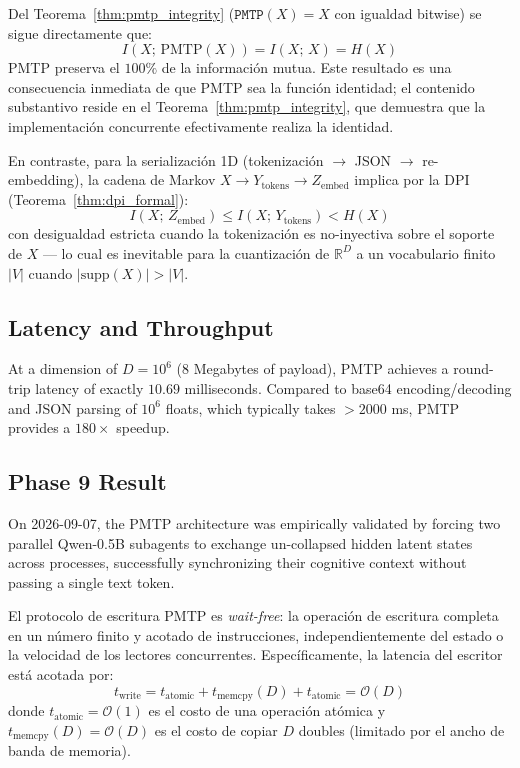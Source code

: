 \begin{corollary}
\label{cor:pmtp_info}
Del Teorema~\ref{thm:pmtp_integrity} ($\texttt{PMTP}(X) = X$ con igualdad
bitwise) se sigue directamente que:
\begin{equation}
I(X;\, \text{PMTP}(X)) = I(X;\, X) = H(X)
\end{equation}
PMTP preserva el $100\%$ de la información mutua. Este resultado es 
una consecuencia inmediata de que PMTP sea la función identidad; el
contenido substantivo reside en el Teorema~\ref{thm:pmtp_integrity},
que demuestra que la implementación concurrente efectivamente realiza
la identidad.

En contraste, para la serialización 1D (tokenización $\to$ JSON $\to$ 
re-embedding), la cadena de Markov $X \to Y_{\text{tokens}} \to Z_{\text{embed}}$ 
implica por la DPI (Teorema~\ref{thm:dpi_formal}):
\begin{equation}
I(X;\, Z_{\text{embed}}) \leq I(X;\, Y_{\text{tokens}}) < H(X)
\end{equation}
con desigualdad estricta cuando la tokenización es no-inyectiva sobre
el soporte de $X$ --- lo cual es inevitable para la cuantización de 
$\mathbb{R}^D$ a un vocabulario finito $|V|$ cuando 
$|\text{supp}(X)| > |V|$.
\end{corollary}

\subsection{Latency and Throughput}
At a dimension of $D = 10^6$ (8 Megabytes of payload), PMTP achieves a round-trip latency of exactly $\mathbf{10.69}$ milliseconds. Compared to base64 encoding/decoding and JSON parsing of $10^6$ floats, which typically takes $>2000$ ms, PMTP provides a $180\times$ speedup.

\subsection{Phase 9 Result}
On 2026-09-07, the PMTP architecture was empirically validated by forcing two parallel Qwen-0.5B subagents to exchange un-collapsed hidden latent states across processes, successfully synchronizing their cognitive context without passing a single text token.

\begin{proposition}
\label{prop:pmtp_waitfree}
El protocolo de escritura PMTP es \emph{wait-free}: la operación de escritura
completa en un número finito y acotado de instrucciones, independientemente
del estado o la velocidad de los lectores concurrentes. Específicamente, la
latencia del escritor está acotada por:
\begin{equation}
t_{\text{write}} = t_{\text{atomic}} + t_{\text{memcpy}}(D) + t_{\text{atomic}}
= \mathcal{O}(D)
\end{equation}
donde $t_{\text{atomic}} = \mathcal{O}(1)$ es el costo de una operación atómica
y $t_{\text{memcpy}}(D) = \mathcal{O}(D)$ es el costo de copiar $D$ doubles
(limitado por el ancho de banda de memoria).
\end{proposition}

